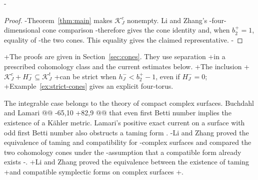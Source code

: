\begin{corollary}
-\begin{proof}
-Theorem~\ref{thm:main} makes \(\mathcal K_J^c\) nonempty. Li and Zhang's
-four-dimensional cone comparison \cite[Corollary~1.1]{LiZhang2009}
-therefore gives the cone identity and, when \(b_2^+=1\), equality of
-the two cones. This equality gives the claimed representative.
-\end{proof}
+The proofs are given in Section~\ref{sec:cones}. They use separation
+in a prescribed cohomology class and the current estimates below.
+The inclusion
+\(\mathcal K_J^c+H_J^-\subseteq\mathcal K_J^t\)
+can be strict when \(h_J^-<b_2^+-1\), even if \(H_J^-=0\);
+Example~\ref{ex:strict-cones} gives an explicit four-torus.
 
 The integrable case belongs to the theory of compact complex surfaces.
 Buchdahl \cite[Theorem~11]{Buchdahl1999} and Lamari
@@ -65,10 +82,9 @@
 that even first Betti number implies the existence of a K\"ahler metric.
 Lamari's positive exact current on a surface with odd first Betti number
 also obstructs a taming form \cite[Theorem~6.1]{Lamari1999}.
-Li and Zhang proved the equivalence of taming and compatibility for
-complex surfaces and compared the two cohomology cones under the
-assumption that a compatible form already exists
-\cite[Theorem~1.2 and Corollary~1.1]{LiZhang2009}.
+Li and Zhang proved the equivalence between the existence of taming
+and compatible symplectic forms on complex surfaces
+\cite[Theorem~1.2]{LiZhang2009}.
 

\end{corollary}
